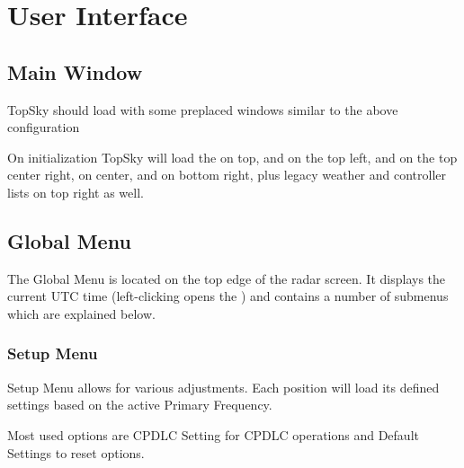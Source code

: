 \documentclass[a4paper,oneside,11pt]{memoir}
\begin{document}
\chapter{User Interface}

\section{Main Window}

TopSky should load with some preplaced windows similar to the above configuration


On initialization TopSky will load the  on top,  and  on the top left,  and  on the top center right,  on center,  and  on bottom right, plus legacy weather and controller lists on top right as well.

\section{Global Menu}
\label{menu:global}

The Global Menu is located on the top edge of the radar screen. It displays the current UTC time (left-clicking opens the ) and contains a number of submenus which are explained below.

\subsection{Setup Menu}
\label{menu:set}

Setup Menu allows for various adjustments. Each position will load its defined settings based on the active Primary Frequency.

Most used options are CPDLC Setting for CPDLC operations and Default Settings to reset options.
\end{document}
